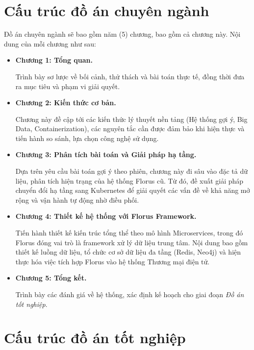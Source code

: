 \section{Cấu trúc đồ án chuyên ngành}
Đồ án chuyên ngành sẽ bao gồm năm (5) chương, bao gồm cả chương này. Nội dung của mỗi chương như sau:

\begin{itemize}
    \item \textbf{Chương 1: Tổng quan.} 
    
    Trình bày sơ lược về bối cảnh, thử thách và bài toán thực tế, đồng thời đưa ra mục tiêu và phạm vi giải quyết.
    
    \item \textbf{Chương 2: Kiến thức cơ bản.} 
    
    Chương này đề cập tới các kiến thức lý thuyết nền tảng (Hệ thống gợi ý, Big Data, Containerization), các nguyên tắc cần được đảm bảo khi hiện thực và tiến hành so sánh, lựa chọn công nghệ sử dụng.
    
    \item \textbf{Chương 3: Phân tích bài toán và Giải pháp hạ tầng.} 
    
    Dựa trên yêu cầu bài toán gợi ý theo phiên, chương này đi sâu vào đặc tả dữ liệu, phân tích hiện trạng của hệ thống Florus cũ. Từ đó, đề xuất giải pháp chuyển đổi hạ tầng sang Kubernetes để giải quyết các vấn đề về khả năng mở rộng và vận hành tự động nhờ điều phối.
    
    \item \textbf{Chương 4: Thiết kế hệ thống với Florus Framework.} 
    
    Tiến hành thiết kế kiến trúc tổng thể theo mô hình Microservices, trong đó Florus đóng vai trò là framework xử lý dữ liệu trung tâm. Nội dung bao gồm thiết kế luồng dữ liệu, tổ chức cơ sở dữ liệu đa tầng (Redis, Neo4j) và hiện thực hóa việc tích hợp Florus vào hệ thống Thương mại điện tử.
    
    \item \textbf{Chương 5: Tổng kết.} 
    
    Trình bày các đánh giá về hệ thống, xác định kế hoạch cho giai đoạn \textit{Đồ án tốt nghiệp}.

\end{itemize}


\section{Cấu trúc đồ án tốt nghiệp}

